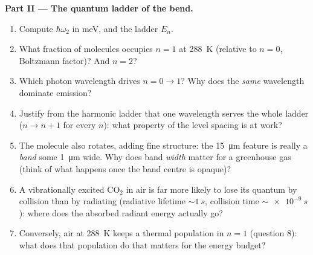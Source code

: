 \begin{problem}
\medskip\noindent\textbf{Part II --- The quantum ladder of the bend.}
\begin{enumerate}[resume]
  \item Compute $\hbar\omega_2$ in meV, and the ladder $E_n$.
  \item What fraction of molecules occupies $n = 1$ at
        \qty{288}{K} (relative to $n = 0$, Boltzmann factor)? And
        $n = 2$?
  \item Which photon wavelength drives $n = 0 \to 1$? Why does the
        \emph{same} wavelength dominate emission?
  \item Justify from the harmonic ladder that one wavelength serves
        the whole ladder ($n \to n + 1$ for every $n$): what
        property of the level spacing is at work?
  \item The molecule also rotates, adding fine structure: the
        \qty{15}{\micro m} feature is really a \emph{band} some
        \qty{1}{\micro m} wide. Why does band \emph{width} matter
        for a greenhouse gas (think of what happens once the band
        centre is opaque)?
  \item A vibrationally excited CO$_2$ in air is far more likely to
        lose its quantum by collision than by radiating (radiative
        lifetime $\sim\qty{1}{s}$, collision time $\sim\qty{e-9}{s}$):
        where does the absorbed radiant energy actually go?
  \item Conversely, air at \qty{288}{K} keeps a thermal population
        in $n = 1$ (question 8): what does that population do that
        matters for the energy budget?
\end{enumerate}


\end{problem}
